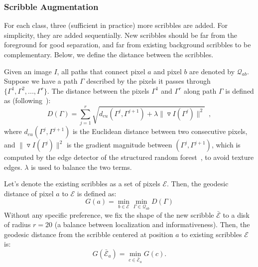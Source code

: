 \documentclass[runningheads]{llncs}
\begin{document}
\subsubsection{Scribble Augmentation}

For each class, three (sufficient in practice) more scribbles are
added. For simplicity, they are added sequentially.  New scribbles
should be far from the foreground for good separation, and far from
existing background scribbles to be complementary.  Below, we define
the distance between the scribbles.

Given an image $I$, all paths that connect pixel $a$ and pixel $b$ are
denoted by $\mathcal{Q}_{ab}$.  Suppose we have a path $\Gamma$
described by the pixels it passes through $\{ \Gamma^1, \Gamma^2,...,
\Gamma^r\}$. The distance between the pixels $\Gamma^1$ and $\Gamma^r$
along path $\Gamma$ is defined as (following~\citep{geodesic:star}):
\begin{equation}
  \label{eq:gdist}
  D(\Gamma) = \sum_{j=1}^{r} \sqrt{ d_{eu}(\Gamma^j, \Gamma^{j+1}) + \lambda \| \triangledown I(\Gamma^j)\|^2}  \enspace ,
\end{equation}
where $d_{eu}(\Gamma^j, \Gamma^{j+1})$ is the Euclidean distance
between two consecutive pixels, and $\| \triangledown I(\Gamma^j)\|^2$
is the gradient magnitude between $(\Gamma^j,\Gamma^{j+1})$, which is
computed by the edge detector of the structured random
forest~\citep{edge:srf}, to avoid texture edges. $\lambda$ is used to
balance the two terms.

Let's denote the existing scribbles as a set of pixels
$\mathcal{E}$. Then, the geodesic distance of pixel $a$ to $\mathcal{E}$ is defined as:
\begin{equation}
  \label{eq:gdist2}
  G(a) =  \min_{b\in \mathcal{E}}  \min_{\Gamma \in \mathcal{Q}_{ab}} D(\Gamma) 
\end{equation}
Without any specific preference, we fix the shape of the new scribble
$\bar{\mathcal{E}}$ to a disk of radius $r=20$ (a balance between
localization and informativeness). Then, the geodesic distance from
the scribble centered at position $a$ to existing scribbles
$\mathcal{E}$ is:
\begin{equation}
  \label{eq:gdist:set}
  G(\bar{\mathcal{E}}_a)  =  \min_{c \in \bar{\mathcal{E}}_a} G(c).
\end{equation}
\end{document}
